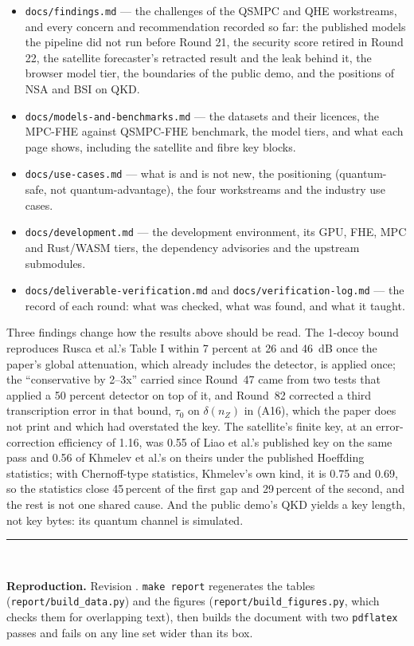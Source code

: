 \documentclass[11pt,a4paper]{article}
\begin{document}
\begin{itemize}
  \item \texttt{docs/findings.md} --- the challenges of the QSMPC and QHE workstreams, and every
        concern and recommendation recorded so far: the published models the pipeline did not run
        before Round 21, the security score retired in Round 22, the satellite forecaster's retracted
        result and the leak behind it, the browser model tier, the boundaries of the public demo, and
        the positions of NSA and BSI on QKD.
  \item \texttt{docs/models-and-benchmarks.md} --- the datasets and their licences, the MPC-FHE
        against QSMPC-FHE benchmark, the model tiers, and what each page shows, including the
        satellite and fibre key blocks.
  \item \texttt{docs/use-cases.md} --- what is and is not new, the positioning (quantum-safe, not
        quantum-advantage), the four workstreams and the industry use cases.
  \item \texttt{docs/development.md} --- the development environment, its GPU, FHE, MPC and
        Rust/WASM tiers, the dependency advisories and the upstream submodules.
  \item \texttt{docs/deliverable-verification.md} and \texttt{docs/verification-log.md} --- the
        record of each round: what was checked, what was found, and what it taught.
\end{itemize}

Three findings change how the results above should be read. The 1-decoy bound reproduces Rusca et
al.'s Table I within 7 percent at 26 and 46~dB once the paper's global attenuation, which already
includes the detector, is applied once; the ``conservative by 2--3x'' carried since Round~47 came
from two tests that applied a 50 percent detector on top of it, and Round~82 corrected a third
transcription error in that bound, $\tau_0$ on $\delta(n_Z)$ in (A16), which the paper does not print
and which had overstated the key. The satellite's finite key, at an error-correction efficiency of
1.16, was 0.55 of Liao et al.'s published key on the same pass and 0.56 of Khmelev et al.'s on
theirs under the published Hoeffding statistics; with Chernoff-type statistics, Khmelev's own kind,
it is 0.75 and 0.69, so the statistics close 45\,percent of the first gap and 29\,percent of the
second, and the rest is not one shared cause. And the public demo's QKD yields a key length, not key bytes: its quantum channel is simulated.

\vspace{4mm}
\noindent\rule{\textwidth}{0.4pt}\\
\begin{small}
\textbf{Reproduction.} Revision \texttt{\gitsha}. \texttt{make report} regenerates the tables
(\texttt{report/build\_data.py}) and the figures (\texttt{report/build\_figures.py}, which checks them
for overlapping text), then builds the document with two \texttt{pdflatex} passes and fails on any
line set wider than its box.
\end{small}
\end{document}
